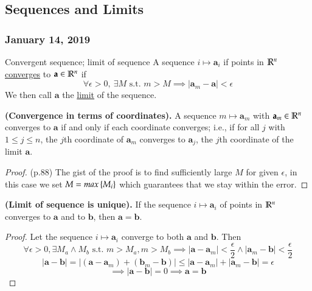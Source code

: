 \subsection{Sequences and Limits}
\subsubsection*{January 14, 2019}

\begin{defn}{Convergent sequence; limit of sequence}
A sequence $i \mapsto \bm{a}_i$ if points in $\mathbb{R}^n$ \ul{converges} to $\textbf{a}\in \mathbb{R}^n$ if
\begin{equation}
	\forall \epsilon > 0,\ \exists M \text{ s.t. } m > M \implies |\bm{a}_m-\bm{a}| < \epsilon
\end{equation}
We then call $\bm{a}$ the \ul{limit} of the sequence.
\end{defn}

\begin{proposition}
  \textbf{(Convergence in terms of coordinates).} A sequence $m\mapsto \bm{a}_m$ with $\textbf{a}_m\in\mathbb{R}^n$ converges to $\bm{a}$ if and only if each coordinate converges; i.e., if for all $j$ with $1\leq j\leq n$, the $j$th coordinate of $\bm{a}_m$ converges to $\bm{a}_j$, the $j$th coordinate of the limit $\bm{a}$.
\end{proposition}

\begin{proof}
(p.88) The gist of the proof is to find sufficiently large $M$ for given $\epsilon$, in this case we set $M = max\left\{ M_i \right\}$ which guarantees that we stay within the error. 
\end{proof}

\begin{proposition}
\textbf{(Limit of sequence is unique). } If the sequence $i\mapsto \bm{a}_i$ of points in $\mathbb{R}^n$ converges to $\bm{a}$ and to $\bm{b}$, then $\bm{a}=\bm{b}$.
\end{proposition}

\begin{proof}
Let the sequence $i\mapsto \bm{a}_i$ converge to both $\bm{a}$ and $\bm{b}$. Then \[\forall \epsilon > 0, \exists M_a \land M_b \text{ s.t. } m > M_a, m > M_b \implies |\bm{a}-\bm{a}_{m}| < \frac{\epsilon}{2} \land |\bm{a}_{m} - \bm{b}| < \frac{\epsilon}{2}\]
\[|\bm{a}-\bm{b}|=|(\bm{a}-\bm{a}_m)+(\bm{b}_m-\bm{b})| \leq |\bm{a}-\bm{a}_{m}|+ |\bm{a}_{m} - \bm{b}| = \epsilon\]
\[\implies |\bm{a}-\bm{b}| = 0 \implies \bm{a}=\bm{b}\]
\end{proof}

